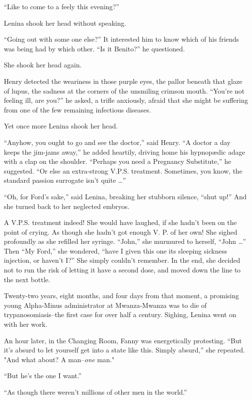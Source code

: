 \documentclass[12pt]{report}
\begin{document}
``Like to come to a feely this evening?''

Lenina shook her head without speaking.

``Going out with some one else?'' It interested him to know which of his
friends was being had by which other. ``Is it Benito?'' he questioned.

She shook her head again.

Henry detected the weariness in those purple eyes, the pallor beneath
that glaze of lupus, the sadness at the corners of the unsmiling crimson
mouth. ``You're not feeling ill, are you?'' he asked, a trifle
anxiously, afraid that she might be suffering from one of the few
remaining infectious diseases.

Yet once more Lenina shook her head.

``Anyhow, you ought to go and see the doctor,'' said Henry. ``A doctor a
day keeps the jim-jams away,'' he added heartily, driving home his
hypnopædic adage with a clap on the shoulder. ``Perhaps you need a
Pregnancy Substitute,'' he suggested. ``Or else an extra-strong V.P.S.
treatment. Sometimes, you know, the standard passion surrogate isn't
quite \ldots{}''

``Oh, for Ford's sake,'' said Lenina, breaking her stubborn silence,
``shut up!'' And she turned back to her neglected embryos.

A V.P.S. treatment indeed! She would have laughed, if she hadn't been on
the point of crying. As though she hadn't got enough V. P. of her own!
She sighed profoundly as she refilled her syringe. ``John,'' she
murmured to herself, ``John \ldots{}'' Then ``My Ford,'' she wondered,
``have I given this one its sleeping sickness injection, or haven't I?''
She simply couldn't remember. In the end, she decided not to run the
risk of letting it have a second dose, and moved down the line to the
next bottle.

Twenty-two years, eight months, and four days from that moment, a
promising young Alpha-Minus administrator at Mwanza-Mwanza was to die of
trypanosomiasis--the first case for over half a century. Sighing, Lenina
went on with her work.

An hour later, in the Changing Room, Fanny was energetically protesting.
``But it's absurd to let yourself get into a state like this. Simply
absurd,'' she repeated. "And what about? A man--\emph{one} man."

``But he's the one I want.''

``As though there weren't millions of other men in the world.''
\end{document}
